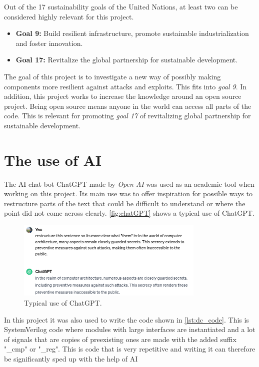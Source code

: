 Out of the 17 sustainability goals of the United Nations\cite{un}, at least two can be considered highly relevant for this project. 

\begin{itemize}
    \item \textbf{Goal 9:} Build resilient infrastructure, promote sustainable industrialization and foster innovation.
    \item \textbf{Goal 17:} Revitalize the global partnership for sustainable development.
\end{itemize}

The goal of this project is to investigate a new way of possibly making components more resilient against attacks and exploits. This fits into \textit{goal 9}. In addition, this project works to increase the knowledge around an open source project. Being open source means anyone in the world can access all parts of the code. This is relevant for promoting \textit{goal 17} of revitalizing global partnership for sustainable development. 

\section{The use of AI}
\label{sec:AI}

The AI chat bot ChatGPT made by \textit{Open AI}\cite{chat} was used as an academic tool when working on this project. Its main use was to offer inspiration for possible ways to restructure parts of the text that could be difficult to understand or where the point did not come across clearly. \autoref{fig:chatGPT} shows a typical use of ChatGPT.

\begin{figure}[h!]
    \centering
    \includegraphics[width=0.8\textwidth]{docs/images/chat_gpt_use.png}
    \caption{Typical use of ChatGPT.}
    \label{fig:chatGPT}
\end{figure}

In this project it was also used to write the code shown in \autoref{lst:dc_code}. This is SystemVerilog code where modules with large interfaces are instantiated and a lot of signals that are copies of preexisting ones are made with the added suffix "\_cmp" or "\_reg". This is code that is very repetitive and writing it can therefore be significantly sped up with the help of AI